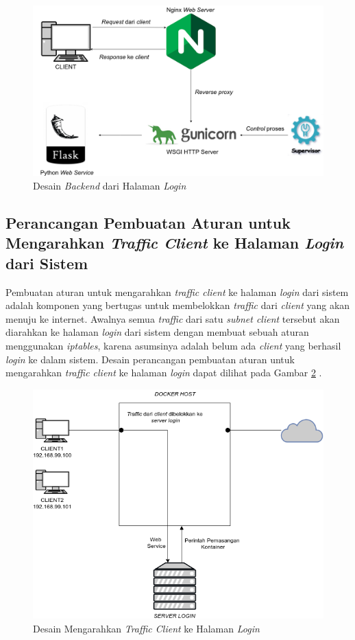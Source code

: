 \begin{figure}[H]
	\centering
	\includegraphics[width=\linewidth]{images/bab3/DesainBackend}
	\caption{Desain \textit{Backend} dari Halaman \textit{Login}}
	\label{desainbackendhalamanlogin}
\end{figure}

\subsection{Perancangan Pembuatan Aturan untuk Mengarahkan \textit{Traffic Client} ke Halaman \textit{Login} dari Sistem}
Pembuatan aturan untuk mengarahkan \textit{traffic client} ke halaman \textit{login} dari sistem adalah komponen yang bertugas untuk membelokkan \textit{traffic} dari \textit{client} yang akan menuju ke internet. Awalnya semua \textit{traffic} dari satu \textit{subnet client} tersebut akan diarahkan ke halaman \textit{login} dari sistem dengan membuat sebuah aturan menggunakan \textit{iptables}, karena asumsinya adalah belum ada \textit{client} yang berhasil \textit{login} ke dalam sistem. Desain perancangan pembuatan aturan untuk mengarahkan \textit{traffic client} ke halaman \textit{login} dapat dilihat pada Gambar \ref{dessainmengarahkankehalamanlogin} .
\begin{figure}[H]
	\centering
	\includegraphics[width=\linewidth]{images/bab3/DIAGRAM2}
	\caption{Desain Mengarahkan \textit{Traffic Client} ke Halaman \textit{Login}}
	\label{dessainmengarahkankehalamanlogin}
\end{figure}

